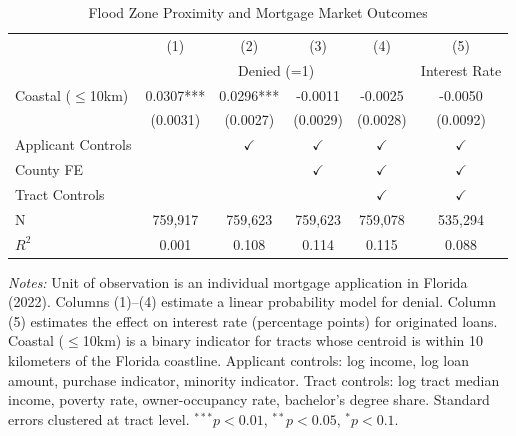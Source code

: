 \begin{table}[htbp]
\centering
\caption{Flood Zone Proximity and Mortgage Market Outcomes}
\label{tab:main}
\small
\begin{tabular}{lccccc}
\hline\hline
 & (1) & (2) & (3) & (4) & (5) \\
 & \multicolumn{4}{c}{Denied (=1)} & Interest Rate \\
\hline
Coastal ($\leq$10km) & 0.0307*** & 0.0296*** & -0.0011 & -0.0025 & -0.0050 \\
 & (0.0031) & (0.0027) & (0.0029) & (0.0028) & (0.0092) \\
\hline
Applicant Controls & & $\checkmark$ & $\checkmark$ & $\checkmark$ & $\checkmark$ \\
County FE & & & $\checkmark$ & $\checkmark$ & $\checkmark$ \\
Tract Controls & & & & $\checkmark$ & $\checkmark$ \\
\hline
N & 759,917 & 759,623 & 759,623 & 759,078 & 535,294 \\
$R^2$ & 0.001 & 0.108 & 0.114 & 0.115 & 0.088 \\
\hline\hline
\end{tabular}
\begin{tablenotes}[flushleft]\small
\item \textit{Notes:} Unit of observation is an individual mortgage application in Florida (2022). Columns (1)--(4) estimate a linear probability model for denial. Column (5) estimates the effect on interest rate (percentage points) for originated loans. Coastal ($\leq$10km) is a binary indicator for tracts whose centroid is within 10 kilometers of the Florida coastline. Applicant controls: log income, log loan amount, purchase indicator, minority indicator. Tract controls: log tract median income, poverty rate, owner-occupancy rate, bachelor's degree share. Standard errors clustered at tract level. $^{***}p<0.01$, $^{**}p<0.05$, $^{*}p<0.1$.
\end{tablenotes}
\end{table}

